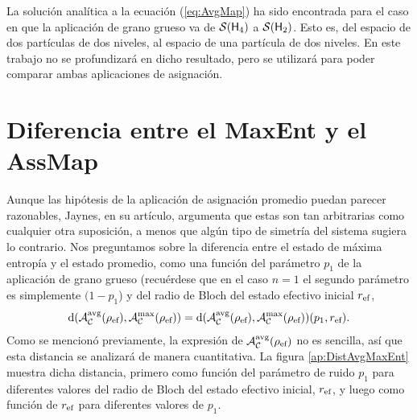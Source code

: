 La solución analítica a la ecuación (\ref{eq:AvgMap}) ha sido encontrada para el caso en que la aplicación de grano grueso va de $\mathcal{S}({\sf H}_{4})$ a $\mathcal{S}({\sf H}_{2})$. Esto es, del espacio de dos partículas de dos niveles, al espacio de una partícula de dos niveles. En este trabajo no se profundizará en dicho resultado, pero se utilizará para poder comparar ambas aplicaciones de asignación.

\section{Diferencia entre el MaxEnt y el AssMap}

Aunque las hipótesis de la aplicación de asignación promedio puedan parecer razonables, Jaynes, en su artículo, argumenta que estas son tan arbitrarias como cualquier otra suposición, a menos que algún tipo de simetría del sistema sugiera lo contrario. Nos preguntamos sobre la diferencia entre el estado de máxima entropía y el estado promedio, como una función del parámetro $p_{1}$ de la aplicación de grano grueso (recuérdese que en el caso $n=1$ el segundo parámetro es simplemente $(1-p_{1}$) y del radio de Bloch del estado efectivo inicial $r_{\text{ef}}$, \ie{} 
\begin{equation}\label{eq:DistAvgMaxEnt}
    \text{d}\qty(\mathcal{A}_{\mathcal{C}}^{\text{avg}}(\rho_{\text{ef}}),\mathcal{A}_{\mathcal{C}}^{\max}(\rho_{\text{ef}}))=\text{d}\qty(\mathcal{A}_{\mathcal{C}}^{\text{avg}}(\rho_{\text{ef}}),\mathcal{A}_{\mathcal{C}}^{\max}(\rho_{\text{ef}}))(p_{1},r_{\text{ef}}).\nonumber
\end{equation}
Como se mencionó previamente, la expresión de $\mathcal{A}_{\mathcal{C}}^{\text{avg}}(\rho_{\text{ef}})$ no es sencilla, así que esta distancia se analizará de manera cuantitativa. La figura \ref{ap:DistAvgMaxEnt} muestra dicha distancia, primero como función del parámetro de ruido $p_{1}$ para diferentes valores del radio de Bloch del estado efectivo inicial, $r_{\text{ef}}$, y luego como función de $r_{\text{ef}}$ para diferentes valores de $p_{1}$.
